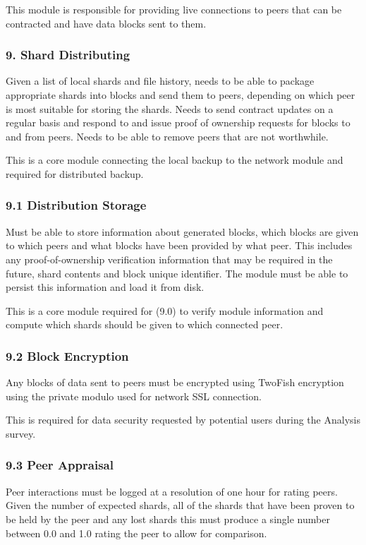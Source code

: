 \documentclass[11pt, a4paper, twocolumn, twoside]{report}
\begin{document}
This module is responsible for providing live connections to peers that can be contracted and have data blocks sent to them.

\subsubsection{9. Shard Distributing}
Given a list of local shards and file history, needs to be able to package appropriate shards into blocks and send them to peers, depending on which peer is most suitable for storing the shards. Needs to send contract updates on a regular basis and respond to and issue proof of ownership requests for blocks to and from peers. Needs to be able to remove peers that are not worthwhile.

This is a core module connecting the local backup to the network module and required for distributed backup.

\subsubsection{9.1 Distribution Storage}
Must be able to store information about generated blocks, which blocks are given to which peers and what blocks have been provided by what peer. This includes any proof-of-ownership verification information that may be required in the future, shard contents and block unique identifier. The module must be able to persist this information and load it from disk.

This is a core module required for (9.0) to verify module information and compute which shards should be given to which connected peer.

\subsubsection{9.2 Block Encryption}
Any blocks of data sent to peers must be encrypted using TwoFish encryption using the private modulo used for network SSL connection.

This is required for data security requested by potential users during the Analysis survey.

\subsubsection{9.3 Peer Appraisal}

Peer interactions must be logged at a resolution of one hour for rating peers. Given the number of expected shards, all of the shards that have been proven to be held by the peer and any lost shards this must produce a single number between 0.0 and 1.0 rating the peer to allow for comparison.
\end{document}
